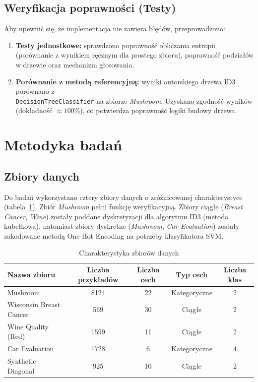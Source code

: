 \documentclass[a4paper,11pt]{article}
\begin{document}
\subsection{Weryfikacja poprawności (Testy)}
Aby upewnić się, że implementacja nie zawiera błędów, przeprowadzono:
\begin{enumerate}
    \item \textbf{Testy jednostkowe:} sprawdzono poprawność obliczania entropii (porównanie z wynikiem ręcznym dla prostego zbioru), poprawność podziałów w drzewie oraz mechanizm głosowania.
    \item \textbf{Porównanie z metodą referencyjną:} wyniki autorskiego drzewa ID3 porównano z \\ \texttt{DecisionTreeClassifier} na zbiorze \textit{Mushroom}. Uzyskano zgodność wyników (dokładność $\approx 100\%$), co potwierdza poprawność logiki budowy drzewa.
\end{enumerate}

\section{Metodyka badań}

\subsection{Zbiory danych}
Do badań wykorzystano cztery zbiory danych o zróżnicowanej charakterystyce (tabela~\ref{tab:zbiory}). Zbiór \textit{Mushroom} pełni funkcję weryfikacyjną. Zbiory ciągłe (\textit{Breast Cancer}, \textit{Wine}) zostały poddane dyskretyzacji dla algorytmu ID3 (metoda kubełkowa), natomiast zbiory dyskretne (\textit{Mushroom}, \textit{Car Evaluation}) zostały zakodowane metodą One-Hot Encoding na potrzeby klasyfikatora SVM.

\begin{table}[H]
    \centering
    \caption{Charakterystyka zbiorów danych}
    \label{tab:zbiory}
    \begin{tabular}{lcccc}
        \toprule
        \textbf{Nazwa zbioru} & \textbf{Liczba przykładów} & \textbf{Liczba cech} & \textbf{Typ cech} & \textbf{Liczba klas} \\
        \midrule
        Mushroom & 8124 & 22 & Kategoryczne & 2 \\
        Wisconsin Breast Cancer & 569 & 30 & Ciągłe & 2 \\
        Wine Quality (Red) & 1599 & 11 & Ciągłe & 2 \\
        Car Evaluation & 1728 & 6 & Kategoryczne & 4 \\
        Synthetic Diagonal & 925 & 10 & Ciągłe & 2 \\
        \bottomrule
    \end{tabular}
\end{table}
\end{document}
